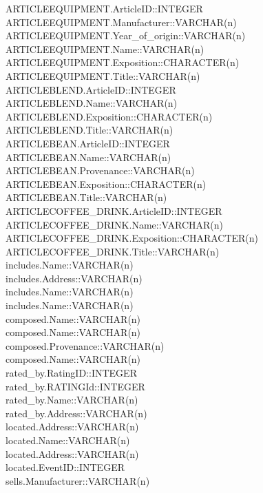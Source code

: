 ARTICLEEQUIPMENT.ArticleID::INTEGER\\
ARTICLEEQUIPMENT.Manufacturer::VARCHAR(n)\\
ARTICLEEQUIPMENT.Year\_of\_origin::VARCHAR(n)\\
ARTICLEEQUIPMENT.Name::VARCHAR(n)\\
ARTICLEEQUIPMENT.Exposition::CHARACTER(n)\\
ARTICLEEQUIPMENT.Title::VARCHAR(n)\\
ARTICLEBLEND.ArticleID::INTEGER\\
ARTICLEBLEND.Name::VARCHAR(n)\\
ARTICLEBLEND.Exposition::CHARACTER(n)\\
ARTICLEBLEND.Title::VARCHAR(n)\\
ARTICLEBEAN.ArticleID::INTEGER\\
ARTICLEBEAN.Name::VARCHAR(n)\\
ARTICLEBEAN.Provenance::VARCHAR(n)\\
ARTICLEBEAN.Exposition::CHARACTER(n)\\
ARTICLEBEAN.Title::VARCHAR(n)\\
ARTICLECOFFEE\_DRINK.ArticleID::INTEGER\\
ARTICLECOFFEE\_DRINK.Name::VARCHAR(n)\\
ARTICLECOFFEE\_DRINK.Exposition::CHARACTER(n)\\
ARTICLECOFFEE\_DRINK.Title::VARCHAR(n)\\
includes.Name::VARCHAR(n)\\
includes.Address::VARCHAR(n)\\
includes.Name::VARCHAR(n)\\
includes.Name::VARCHAR(n)\\
composed.Name::VARCHAR(n)\\
composed.Name::VARCHAR(n)\\
composed.Provenance::VARCHAR(n)\\
composed.Name::VARCHAR(n)\\
rated\_by.RatingID::INTEGER\\
rated\_by.RATINGId::INTEGER\\
rated\_by.Name::VARCHAR(n)\\
rated\_by.Address::VARCHAR(n)\\
located.Address::VARCHAR(n)\\
located.Name::VARCHAR(n)\\
located.Address::VARCHAR(n)\\
located.EventID::INTEGER\\
sells.Manufacturer::VARCHAR(n)\\
